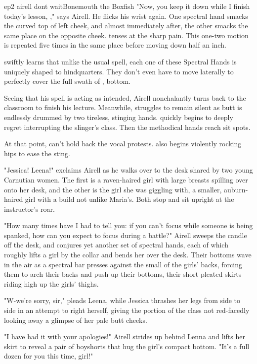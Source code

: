 \documentclass{book}
\begin{document}
\begin{childnode}{ep2 airell dont wait}{Bonemouth the Boxfish}
"Now, you keep it down while I finish today's lesson, \boygirl{}," says Airell. He flicks his wrist again. One spectral hand smacks the curved top of \names{} 
left cheek, and almost immediately after, the other smacks the same place on the opposite cheek. \name{} tenses at the sharp pain. This one-two motion is repeated five times in the same place before 
moving down half an inch.

\name{} swiftly learns that unlike the usual spell, each one of these Spectral Hands is uniquely shaped to \hisher{} \bumadj{} hindquarters. They don't even have to move laterally to perfectly 
cover the full swath of \hisher{} \bumadj{}, \quivering{} bottom. 

Seeing that his spell is acting as intended, Airell nonchalantly turns back to the classroom to finish his lecture. Meanwhile, \name{} struggles to remain silent as \hisher{} \muscleadj{} butt 
is endlessly drummed by two tireless, stinging hands. \HeShe{} quickly begins to deeply regret interrupting the slinger's class. Then the methodical hands reach \hisher{} sit spots. 

At that point, 
\heshe{} can't hold back the vocal protests. \HeShe{} also begins violently rocking \hisher{} hips to ease the sting. 

"Jessica! Leena!" exclaims Airell as he walks over to the desk shared by two young Carnutian women. The first is a raven-haired girl with large breasts spilling over onto her desk, and the other is 
the 
girl she was giggling with, a smaller, auburn-haired girl with a build not unlike Maria's. Both stop and sit upright at the instructor's roar.

"How many times have I had to tell you: if you can't focus while someone is being spanked, how can you expect to focus during a battle?" Airell sweeps the candle off the desk, and conjures yet 
another set of spectral hands, each of 
which roughly lifts a girl by the collar and bends her over the desk. Their bottoms wave in the air as a spectral bar presses against the small of the girls' backs, forcing them to arch their
backs and push up their bottoms, their
short pleated skirts riding high up the girls' thighs.

"W-we're sorry, sir," pleads Leena, while Jessica thrashes her legs from side to side in an attempt to right herself, giving the portion of the class not red-facedly looking away a glimpse of her 
pale butt cheeks. 

"I have had it with your apologies!" Airell strides up behind Lenna and lifts her skirt to reveal a pair of boyshorts that hug the girl's compact bottom. "It's a full dozen for you 
this time, girl!"


\end{childnode}
\end{document}
